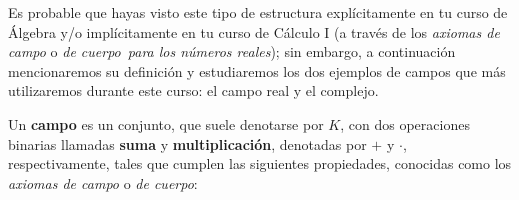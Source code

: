 \documentclass[notasLineal]{subfiles}
\begin{document}
Es probable que hayas visto este tipo de estructura explícitamente en tu curso de Álgebra y/o implícitamente en tu curso de Cálculo I (a través de los \emph{axiomas de campo} \textemdash o \emph{de cuerpo}\textemdash \ \emph{para los números reales}); sin embargo, a continuación mencionaremos su definición y estudiaremos los dos ejemplos de campos que más utilizaremos durante este curso: el campo real y el complejo.

\begin{tcolorbox}[breakable]
    \begin{Def}\label{Def: Campo}
        Un \textbf{campo} es un conjunto, que suele denotarse por $K$, con dos operaciones binarias llamadas \textbf{suma} y \textbf{multiplicación}, denotadas por $+$ y $\cdot$, respectivamente, tales que cumplen las siguientes propiedades, conocidas como los \emph{axiomas de campo} o \emph{de cuerpo}:


\end{Def}
\end{tcolorbox}
\end{document}
